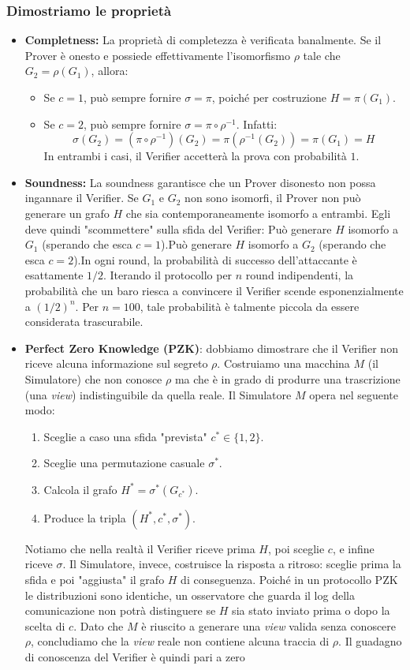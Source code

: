 \subsubsection*{Dimostriamo le proprietà}
\begin{itemize}
    \item \textbf{Completness:} La proprietà di completezza è verificata banalmente. Se il Prover è onesto e possiede effettivamente l'isomorfismo $\rho$ tale che $G_2 = \rho(G_1)$, allora:
    \begin{itemize}
        \item Se $c=1$, può sempre fornire $\sigma = \pi$, poiché per costruzione $H = \pi(G_1)$.
        \item Se $c=2$, può sempre fornire $\sigma = \pi \circ \rho^{-1}$. Infatti:$$\sigma(G_2) = (\pi \circ \rho^{-1})(G_2) = \pi(\rho^{-1}(G_2)) = \pi(G_1) = H$$In entrambi i casi, il Verifier accetterà la prova con probabilità $1$.
    \end{itemize}
    \item \textbf{Soundness:} La soundness garantisce che un Prover disonesto non possa ingannare il Verifier. Se $G_1$ e $G_2$ non sono isomorfi, il Prover non può generare un grafo $H$ che sia contemporaneamente isomorfo a entrambi. Egli deve quindi "scommettere" sulla sfida del Verifier: Può generare $H$ isomorfo a $G_1$ (sperando che esca $c=1$).Può generare $H$ isomorfo a $G_2$ (sperando che esca $c=2$).In ogni round, la probabilità di successo dell'attaccante è esattamente $1/2$. Iterando il protocollo per $n$ round indipendenti, la probabilità che un baro riesca a convincere il Verifier scende esponenzialmente a $(1/2)^n$. Per $n=100$, tale probabilità è talmente piccola da essere considerata trascurabile.
    \item \textbf{Perfect Zero Knowledge (PZK)}: dobbiamo dimostrare che il Verifier non riceve alcuna informazione sul segreto $\rho$.
    Costruiamo una macchina $M$ (il Simulatore) che non conosce $\rho$ ma che è in grado di produrre una trascrizione (una \textit{view}) indistinguibile da quella reale. Il Simulatore $M$ opera nel seguente modo:
    \begin{enumerate}
        \item Sceglie a caso una sfida "prevista" $c^* \in \{1, 2\}$.
        \item Sceglie una permutazione casuale $\sigma^*$.
        \item Calcola il grafo $H^* = \sigma^*(G_{c^*})$.
        \item Produce la tripla $(H^*, c^*, \sigma^*)$.
    \end{enumerate}
    Notiamo che nella realtà il Verifier riceve prima $H$, poi sceglie $c$, e infine riceve $\sigma$. Il Simulatore, invece, costruisce la risposta a ritroso: sceglie prima la sfida e poi "aggiusta" il grafo $H$ di conseguenza. Poiché in un protocollo PZK le distribuzioni sono identiche, un osservatore che guarda il log della comunicazione non potrà distinguere se $H$ sia stato inviato prima o dopo la scelta di $c$. Dato che $M$ è riuscito a generare una \textit{view} valida senza conoscere $\rho$, concludiamo che la \textit{view} reale non contiene alcuna traccia di $\rho$. Il guadagno di conoscenza del Verifier è quindi pari a zero
\end{itemize}
